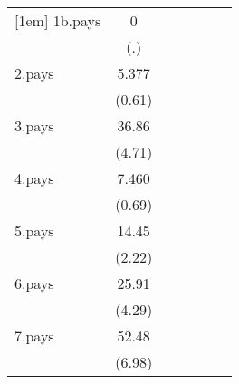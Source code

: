 {\begin{tabular}{l*{6}{c}}
[1em]
1b.pays             &           0         &                     &                     &                     &                     &                     \\
                    &         (.)         &                     &                     &                     &                     &                     \\
[1em]
2.pays              &       5.377         &                     &                     &                     &                     &                     \\
                    &      (0.61)         &                     &                     &                     &                     &                     \\
[1em]
3.pays              &       36.86\sym{***}&                     &                     &                     &                     &                     \\
                    &      (4.71)         &                     &                     &                     &                     &                     \\
[1em]
4.pays              &       7.460         &                     &                     &                     &                     &                     \\
                    &      (0.69)         &                     &                     &                     &                     &                     \\
[1em]
5.pays              &       14.45\sym{*}  &                     &                     &                     &                     &                     \\
                    &      (2.22)         &                     &                     &                     &                     &                     \\
[1em]
6.pays              &       25.91\sym{***}&                     &                     &                     &                     &                     \\
                    &      (4.29)         &                     &                     &                     &                     &                     \\
[1em]
7.pays              &       52.48\sym{***}&                     &                     &                     &                     &                     \\
                    &      (6.98)         &                     &                     &                     &                     &                     \\

\end{tabular}}
